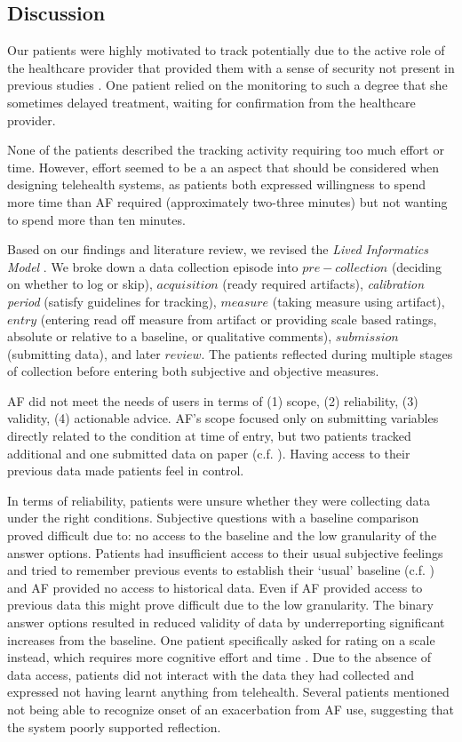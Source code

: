 \subsection{Discussion}
Our patients were highly motivated to track potentially due to the active role of the healthcare provider that provided them with a sense of security not present in previous studies \cite{Li2010, Ancker2015, Chung2015}. One patient relied on the monitoring to such a degree that she sometimes delayed treatment, waiting for confirmation from the healthcare provider.
 
None of the patients described the tracking activity requiring too much effort or time. However, effort seemed to be a an aspect that should be considered when designing telehealth systems, as patients both expressed willingness to spend more time than AF required (approximately two-three minutes) but not wanting to spend more than ten minutes.

Based on our findings and literature review, we revised the \textit{Lived Informatics Model} \cite{Epstein2015}. We broke down a data collection episode into $pre-collection$ (deciding on whether to log or skip), $acquisition$ (ready required artifacts), \textit{calibration period} (satisfy guidelines for tracking),  $measure$ (taking measure using artifact), $entry$ (entering read off measure from artifact or providing scale based ratings, absolute or relative to a baseline, or qualitative comments), $submission$ (submitting data), and later $review$. The patients reflected during multiple stages of collection before entering both subjective and objective measures. 

AF did not meet the needs of users in terms of (1) scope, (2) reliability, (3) validity, (4) actionable advice. AF’s scope focused only on submitting variables directly related to the condition at time of entry, but two patients tracked additional and one submitted data on paper (c.f. \cite{Patel2012, Chung2016}). Having access to their previous data made patients feel in control. 

In terms of reliability, patients were unsure whether they were collecting data under the right conditions. Subjective questions with a baseline comparison proved difficult due to: no access to the baseline and the low granularity of the answer options. Patients had insufficient access to their usual subjective feelings and tried to remember previous events to establish their ‘usual’ baseline (c.f. \cite{piloting}) and AF provided no access to historical data. Even if AF provided access to previous data this might prove difficult due to the low granularity. The binary answer options resulted in reduced validity of data by underreporting significant increases from the baseline. One patient specifically asked for rating on a scale instead, which requires more cognitive effort and time \cite{Oh2015}. 
Due to the absence of data access, patients did not interact with the data they had collected and expressed not having learnt anything from telehealth. Several patients mentioned not being able to recognize onset of an exacerbation from AF use, suggesting that the system poorly supported reflection. 

